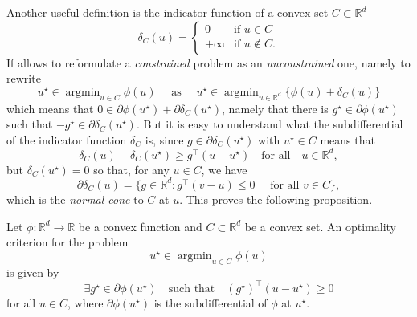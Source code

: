 \documentclass[
	fontsize=11pt, %
	twoside=false, %
	numbers=noenddot, %
]{kaobook}
\DeclareMathOperator*{\argmin}{argmin}
\newcommand{\R}{\mathbb R}
\begin{document}
Another useful definition is the indicator function of a convex set $C \subset \R^d$
\begin{equation*}
	\delta_C(u) = \begin{cases}
		0 &\text{if } u \in C \\
		+\infty &\text{if } u \notin C.
	\end{cases}
\end{equation*}
If allows to reformulate a \emph{constrained} problem as an \emph{unconstrained} one, namely to rewrite
\begin{equation*}
	u^\star \in \argmin_{u \in C} \phi(u) \quad \text{ as } \quad u^\star \in \argmin_{u \in \R^d} \{ \phi(u) + \delta_C(u) \}
\end{equation*}
which means that $0 \in \partial \phi(u^\star) + \partial \delta_C(u^\star)$, namely that there is $g^\star \in \partial \phi(u^\star)$ such that $-g^\star \in \partial \delta_C(u^\star)$.
But it is easy to understand what the subdifferential of the indicator function $\delta_C$ is, since $g \in \partial \delta_C(u^\star)$ with $u^\star \in C$ means%
that
\begin{equation*}
	\delta_C(u) - \delta_C(u^\star) \geq g^\top (u - u^\star) \quad \text{for all} \quad u \in \R^d,
\end{equation*}
but $\delta_C(u^\star) = 0$ so that, for any $u \in C$, we have
\begin{equation*}
	\partial \delta_C(u) = \big\{ g \in \R^d : g^\top (v - u) \leq 0 \quad 
	\text{ for all } v \in C \big\},
\end{equation*}
which is the \emph{normal cone} to $C$ at $u$.
This proves the following proposition.
\begin{proposition}
	\label{prop:optimality-criterion}
	Let $\phi : \R^d \rightarrow \R$ be a convex function and $C \subset \R^d$ be a convex set. 
	An optimality criterion for the problem
	\begin{equation*}
		u^\star \in \argmin_{u \in C} \phi(u)
	\end{equation*}
	is given by
	\begin{equation*}
		\exists g^\star \in \partial \phi(u^\star) \quad \text{such that} 
		\quad (g^\star)^\top (u - u^\star) \geq 0
	\end{equation*}
	for all $u \in C$, where $\partial \phi(u^\star)$ is the subdifferential of $\phi$ at $u^\star$.
\end{proposition}
\end{document}

